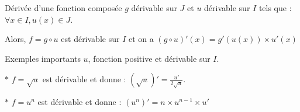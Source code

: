 \medskip

\begin{bclogo}{Dérivée d'une fonction composée}
$g$ dérivable sur $J$ et $u$ dérivable sur $I$ tels que : $\forall x\in I, u(x)\in J$.

Alors, $f=g\circ u$ est dérivable sur $I$ et on a $(g\circ u)'(x)=g'(u(x))\times u'(x)$

\end{bclogo}

\medskip


\begin{bclogo}{Exemples importants}
$u$, fonction positive et dérivable sur $I$. 

$\ast$ $f=\sqrt{u}$ est dérivable et donne : $(\sqrt{u})'=\frac{u'}{2\sqrt{u}}$.

$\ast$ $f=u^n$ est dérivable et donne : $(u^n)'=n\times u^{n-1}\times u'$
\end{bclogo}







